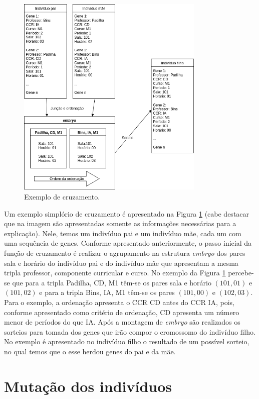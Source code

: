 \documentclass[12pt]{article}
\begin{document}
\begin{figure}[!ht]
\caption{Exemplo de cruzamento.}
\label{fig:cross}
\centering
\includegraphics[width=0.8\textwidth]{cross.png}
\end{figure}

Um exemplo simplório de cruzamento é apresentado na Figura \ref{fig:cross} (cabe destacar que na imagem são apresentadas somente as informações necessárias para a explicação). Nele, temos um indivíduo pai e um indivíduo mãe, cada um com uma sequência de genes. Conforme apresentado anteriormente, o passo inicial da função de cruzamento é realizar o agrupamento na estrutura \emph{embryo} dos pares sala e horário do indivíduo pai e do indivíduo mãe que apresentam a mesma tripla professor, componente curricular e curso. No exemplo da Figura \ref{fig:cross} percebe-se que para a tripla Padilha, CD, M1 têm-se os pares sala e horário $(101, 01)$ e $(101, 02)$ e para a tripla Bins, IA, M1 têm-se os pares $(101, 00)$ e $(102, 03)$. Para o exemplo, a ordenação apresenta o CCR CD antes do CCR IA, pois, conforme apresentado como critério de ordenação, CD apresenta um número menor de períodos do que IA. Após a montagem de \emph{embryo} são realizados os sorteios para tomada dos genes que irão compor o cromossomo do indivíduo filho. No exemplo é apresentado no indivíduo filho o resultado de um possível sorteio, no qual temos que o esse herdou genes do pai e da mãe.

\section{Mutação dos indivíduos}
\end{document}
